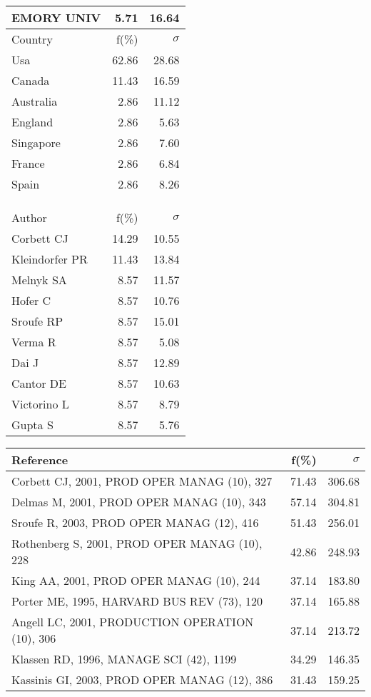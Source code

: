 \documentclass[a4paper,11pt]{report}
\begin{document}
\begin{landscape}
\begin{table}[!ht]
{\begin{tabular}{|l r r|}
EMORY UNIV & 5.71 & 16.64\\
\hline
\hline
Country & f(\%) & $\sigma$\\
\hline
Usa & 62.86 & 28.68\\
Canada & 11.43 & 16.59\\
Australia & 2.86 & 11.12\\
England & 2.86 & 5.63\\
Singapore & 2.86 & 7.60\\
France & 2.86 & 6.84\\
Spain & 2.86 & 8.26\\
 &  & \\
 &  & \\
 &  & \\
\hline
\hline
Author & f(\%) & $\sigma$\\
\hline
Corbett CJ & 14.29 & 10.55\\
Kleindorfer PR & 11.43 & 13.84\\
Melnyk SA & 8.57 & 11.57\\
Hofer C & 8.57 & 10.76\\
Sroufe RP & 8.57 & 15.01\\
Verma R & 8.57 & 5.08\\
Dai J & 8.57 & 12.89\\
Cantor DE & 8.57 & 10.63\\
Victorino L & 8.57 & 8.79\\
Gupta S & 8.57 & 5.76\\
\hline
\end{tabular}
}
{\scriptsize\begin{tabular}{|l r r|}
\hline
Reference & f(\%) & $\sigma$\\
\hline
Corbett CJ, 2001, PROD OPER MANAG (10), 327 & 71.43 & 306.68\\
Delmas M, 2001, PROD OPER MANAG (10), 343 & 57.14 & 304.81\\
Sroufe R, 2003, PROD OPER MANAG (12), 416 & 51.43 & 256.01\\
Rothenberg S, 2001, PROD OPER MANAG (10), 228 & 42.86 & 248.93\\
King AA, 2001, PROD OPER MANAG (10), 244 & 37.14 & 183.80\\
Porter ME, 1995, HARVARD BUS REV (73), 120 & 37.14 & 165.88\\
Angell LC, 2001, PRODUCTION OPERATION (10), 306 & 37.14 & 213.72\\
Klassen RD, 1996, MANAGE SCI (42), 1199 & 34.29 & 146.35\\
Kassinis GI, 2003, PROD OPER MANAG (12), 386 & 31.43 & 159.25\\

\end{tabular}}
\end{table}
\end{landscape}
\end{document}

